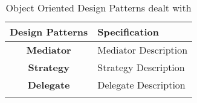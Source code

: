 \begin{longtable}{|| c | p{} |} 
	\hline
	\textbf{Design Patterns} & \textbf{Specification} \\ \hline
	\textbf{Mediator} & 
	Mediator Description\\ \hline
	\textbf{Strategy} &
	Strategy Description\\ \hline
	\textbf{Delegate} & 
	Delegate Description\\ \hline
	\caption{Object Oriented Design Patterns dealt with}
	\label{table:oop_design_patterns}
\end{longtable}